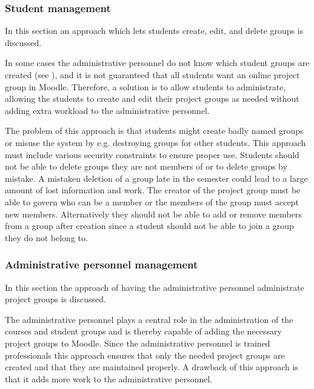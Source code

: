  


\subsubsection{Student management}
In this section an approach which lets students create, edit, and delete groups is discussed. 

In some cases the administrative personnel do not know which student groups are created (see ), and it is not guaranteed that all students want an online project group in Moodle. 
Therefore, a solution is to allow students to administrate, allowing the students to create and edit their project groups as needed without adding extra workload to the administrative personnel.

The problem of this approach is that students might create badly named groups or misuse the system by e.g. destroying groups for other students. 
This approach must include various security constraints to ensure proper use. 
Students should not be able to delete groups they are not members of or to delete groups by mistake. 
A mistaken deletion of a group late in the semester could lead to a large amount of lost information and work. 
The creator of the project group must be able to govern who can be a member or the members of the group must accept new members.
Alternatively they should not be able to add or remove members from a group after creation since a student should not be able to join a group they do not belong to. 


\subsubsection{Administrative personnel management}
In this section the approach of having the administrative personnel administrate project groups is discussed. 

The administrative personnel plays a central role in the administration of the courses and student groups and is thereby capable of adding the necessary project groups to Moodle. 
Since the administrative personnel is trained professionals this approach ensures that only the needed project groups are created and that they are maintained properly. 
A drawback of this approach is that it adds more work to the administrative personnel.

